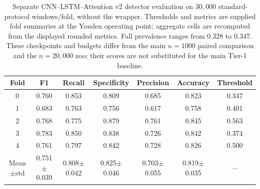 \begin{table}[!t]
\centering
\caption{Separate CNN--LSTM--Attention v2 detector evaluation on $30{,}000$ standard-protocol windows/fold, without the wrapper. Thresholds and metrics are supplied fold summaries at the Youden operating point; aggregate cells are recomputed from the displayed rounded metrics. Fall prevalence ranges from $0.328$ to $0.347$. These checkpoints and budgets differ from the main $n=1000$ paired comparison and the $n=20{,}000$ zoo; their scores are not substituted for the main Tier-1 baseline.}
\label{tab:g1primary}
\begin{tabular}{ccccccc}
\toprule
Fold & F1 & Recall & Specificity & Precision & Accuracy & Threshold \\
\midrule
0 & 0.760 & 0.853 & 0.809 & 0.685 & 0.823 & 0.347 \\
1 & 0.683 & 0.763 & 0.756 & 0.617 & 0.758 & 0.401 \\
2 & 0.768 & 0.775 & 0.879 & 0.761 & 0.845 & 0.563 \\
3 & 0.783 & 0.850 & 0.838 & 0.726 & 0.842 & 0.374 \\
4 & 0.761 & 0.797 & 0.842 & 0.728 & 0.826 & 0.500 \\
\midrule
Mean$\pm$std & 0.751$\pm$0.039 & 0.808$\pm$0.042 & 0.825$\pm$0.046 & 0.703$\pm$0.055 & 0.819$\pm$0.035 & --- \\
\bottomrule
\end{tabular}
\end{table}